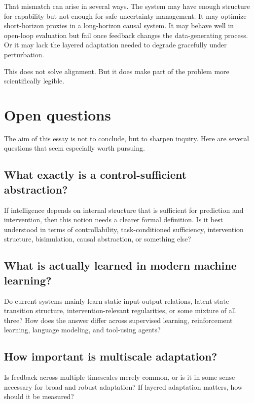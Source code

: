 \documentclass[11pt]{article}
\begin{document}
That mismatch can arise in several ways. The system may have enough structure for capability but not enough for safe uncertainty management. It may optimize short-horizon proxies in a long-horizon causal system. It may behave well in open-loop evaluation but fail once feedback changes the data-generating process. Or it may lack the layered adaptation needed to degrade gracefully under perturbation.

This does not solve alignment. But it does make part of the problem more scientifically legible.

\section{Open questions}


The aim of this essay is not to conclude, but to sharpen inquiry. Here are several questions that seem especially worth pursuing.

\subsection{What exactly is a control-sufficient abstraction?}

If intelligence depends on internal structure that is sufficient for prediction and intervention, then this notion needs a clearer formal definition. Is it best understood in terms of controllability, task-conditioned sufficiency, intervention structure, bisimulation, causal abstraction, or something else?

\subsection{What is actually learned in modern machine learning?}

Do current systems mainly learn static input-output relations, latent state-transition structure, intervention-relevant regularities, or some mixture of all three? How does the answer differ across supervised learning, reinforcement learning, language modeling, and tool-using agents?

\subsection{How important is multiscale adaptation?}

Is feedback across multiple timescales merely common, or is it in some sense necessary for broad and robust adaptation? If layered adaptation matters, how should it be measured?
\end{document}

